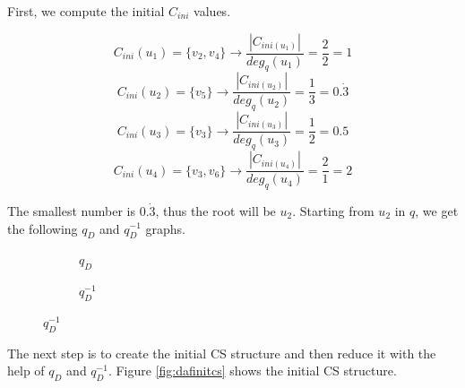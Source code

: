 \begin{example}
    First, we compute the initial $C_{ini}$ values.

    \[
        C_{ini}(u_1) = \{v_2, v_4\} \rightarrow \frac{|C_{ini(u_1)}|}{deg_q(u_1)} = \frac{2}{2} = 1
    \]
    \[
        C_{ini}(u_2) = \{v_5\} \rightarrow \frac{|C_{ini(u_2)}|}{deg_q(u_2)} = \frac{1}{3} = 0.\dot{3}
    \]
    \[
        C_{ini}(u_3) = \{v_3\} \rightarrow \frac{|C_{ini(u_3)}|}{deg_q(u_3)} = \frac{1}{2} = 0.5
    \]
    \[
        C_{ini}(u_4) = \{v_3,v_6\} \rightarrow \frac{|C_{ini(u_4)}|}{deg_q(u_4)} = \frac{2}{1} = 2
    \]

    The smallest number is $0.\dot{3}$, thus the root will be $u_2$. Starting from $u_2$ in $q$, we get
    the following $q_D$ and $q^{-1}_D$ graphs.

    \begin{figure}[h!]
        \centering
        \begin{subfigure}{.4\textwidth}
            \centering
          \caption{$q_D$}
        \end{subfigure}
        \begin{subfigure}{.4\textwidth}
            \centering
          \caption{$q^{-1}_D$}
        \end{subfigure}        
        \label{fig:dafqd}
    \end{figure}

    The next step is to create the initial CS structure and then reduce it with the help of $q_D$ and $q^{-1}_D$.
    Figure \ref{fig:dafinitcs} shows the initial CS structure.


\end{example}
